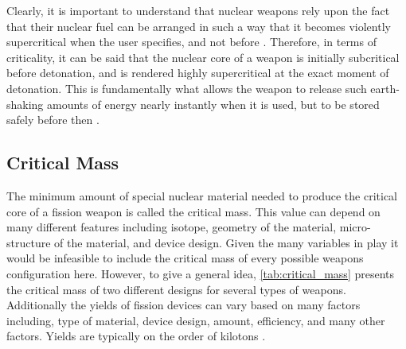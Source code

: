 \documentclass{report}
\begin{document}
Clearly, it is important to understand that nuclear weapons rely upon the fact that their nuclear fuel can be arranged in such a way that it becomes violently supercritical when the user specifies, and not before \cite{Lewis2008}. Therefore, in terms of criticality, it can be said that the nuclear core of a weapon is initially subcritical before detonation, and  is rendered highly supercritical at the exact moment of detonation. This is fundamentally what allows the weapon to release such earth-shaking amounts of energy nearly instantly when it is used, but to be stored safely before then \cite{Prussin2014,Defense1998}. 


\subsection{Critical Mass}

The minimum amount of special nuclear material needed to produce the critical core of a  fission weapon is called the critical mass. This value can depend on many different features including isotope, geometry of the material, micro-structure of the material, and device design. Given the many variables in play it would be infeasible to include the critical mass of every possible weapons configuration here. However, to give a general idea, \autoref{tab:critical_mass} presents the critical mass of two different designs for several types of weapons. Additionally the yields of fission devices can vary based on many factors including, type of material, device design, amount, efficiency, and many other factors. Yields are typically on the order of kilotons \cite{Moody2014}. 
\end{document}
